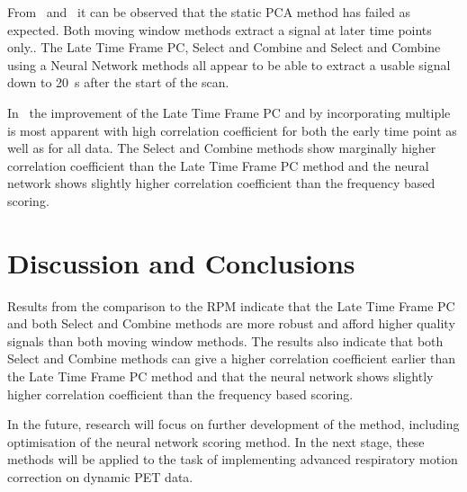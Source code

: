     
    
     From~ and~ it can be observed that the static \gls{PCA} method has failed as expected. Both moving window methods extract a signal at later time points only.. The Late Time Frame \gls{PC}, Select and Combine and Select and Combine using a Neural Network methods all appear to be able to extract a usable signal down to \SI{20}{\second} after the start of the scan.
    
    In~ the improvement of the Late Time Frame \gls{PC} and by incorporating multiple  is most apparent with high correlation coefficient for both the early time point as well as for all data. The Select and Combine methods show marginally higher correlation coefficient than the Late Time Frame \gls{PC} method and the neural network shows slightly higher correlation coefficient than the frequency based scoring.
    

\vspace{-0.5cm}

\section{Discussion and Conclusions} \label{sec:discussion_and_conclusions}
    Results from the comparison to the \gls{RPM} indicate that the Late Time Frame \gls{PC} and both Select and Combine methods are more robust and afford higher quality signals than both moving window methods. The results also indicate that both Select and Combine methods can give a higher correlation coefficient earlier than the Late Time Frame \gls{PC} method and that the neural network shows slightly higher correlation coefficient than the frequency based scoring.
    
    In the future, research will focus on further development of the method, including optimisation of the neural network scoring method. In the next stage, these methods will be applied to the task of implementing advanced respiratory motion correction on dynamic \acrshort{PET} data.